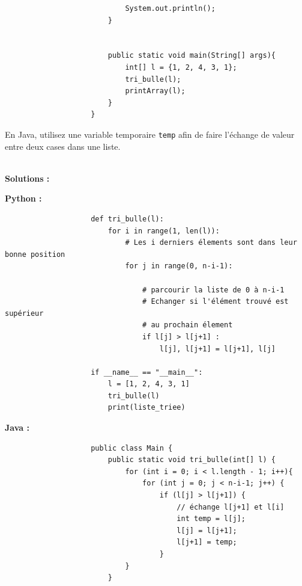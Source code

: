 \begin{Exercice} [20 minutes]
\begin{itemize}
\begin{verbatim}
                            System.out.println(); 
                        } 
              
                        
                        public static void main(String[] args){
                            int[] l = {1, 2, 4, 3, 1};
                            tri_bulle(l);
                            printArray(l);
                        }
                    }
                \end{verbatim}
    \end{itemize}
    
    \begin{conseil}
    En Java, utilisez une variable temporaire \lstinline{temp} afin de faire l'échange de valeur entre deux cases dans une liste.
    \end{conseil}
    
    \ \\
    
    \textbf{Solutions :}
    \item \textbf{Python :}
                \begin{verbatim}
                    def tri_bulle(l):
                        for i in range(1, len(l)):
                            # Les i derniers élements sont dans leur bonne position 
                            for j in range(0, n-i-1): 
                      
                                # parcourir la liste de 0 à n-i-1 
                                # Echanger si l'élément trouvé est supérieur 
                                # au prochain élement
                                if l[j] > l[j+1] : 
                                    l[j], l[j+1] = l[j+1], l[j] 
                    
                    if __name__ == "__main__":
                        l = [1, 2, 4, 3, 1]
                        tri_bulle(l)
                        print(liste_triee)
                \end{verbatim}
        \item \textbf{Java :}
                \begin{verbatim}
                    public class Main {
                        public static void tri_bulle(int[] l) {
                            for (int i = 0; i < l.length - 1; i++){
                                for (int j = 0; j < n-i-1; j++) {
                                    if (l[j] > l[j+1]) { 
                                        // échange l[j+1] et l[i] 
                                        int temp = l[j]; 
                                        l[j] = l[j+1]; 
                                        l[j+1] = temp; 
                                    } 
                            }
                        }
                        

\end{verbatim}
\end{Exercice}
